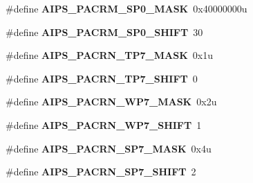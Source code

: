 \begin{DoxyCompactItemize}
\item 
\hypertarget{group___a_i_p_s___register___masks_gaeeebe0a8259e971ab63d9ce8a1576bd2}{}\#define {\bfseries A\+I\+P\+S\+\_\+\+P\+A\+C\+R\+M\+\_\+\+S\+P0\+\_\+\+M\+A\+S\+K}~0x40000000u\label{group___a_i_p_s___register___masks_gaeeebe0a8259e971ab63d9ce8a1576bd2}

\item 
\hypertarget{group___a_i_p_s___register___masks_ga46922ecc0b641603107573cba7a84dc1}{}\#define {\bfseries A\+I\+P\+S\+\_\+\+P\+A\+C\+R\+M\+\_\+\+S\+P0\+\_\+\+S\+H\+I\+F\+T}~30\label{group___a_i_p_s___register___masks_ga46922ecc0b641603107573cba7a84dc1}

\item 
\hypertarget{group___a_i_p_s___register___masks_gaec5f089f628c32d399bbe6ed2e3dfcc9}{}\#define {\bfseries A\+I\+P\+S\+\_\+\+P\+A\+C\+R\+N\+\_\+\+T\+P7\+\_\+\+M\+A\+S\+K}~0x1u\label{group___a_i_p_s___register___masks_gaec5f089f628c32d399bbe6ed2e3dfcc9}

\item 
\hypertarget{group___a_i_p_s___register___masks_ga04cafa9eff42e145fece56b997ae83ee}{}\#define {\bfseries A\+I\+P\+S\+\_\+\+P\+A\+C\+R\+N\+\_\+\+T\+P7\+\_\+\+S\+H\+I\+F\+T}~0\label{group___a_i_p_s___register___masks_ga04cafa9eff42e145fece56b997ae83ee}

\item 
\hypertarget{group___a_i_p_s___register___masks_ga1000a4bd55fe0e5f30e82344f18c24c5}{}\#define {\bfseries A\+I\+P\+S\+\_\+\+P\+A\+C\+R\+N\+\_\+\+W\+P7\+\_\+\+M\+A\+S\+K}~0x2u\label{group___a_i_p_s___register___masks_ga1000a4bd55fe0e5f30e82344f18c24c5}

\item 
\hypertarget{group___a_i_p_s___register___masks_ga862ae8fd2cdce6bb58dbf89582326cbc}{}\#define {\bfseries A\+I\+P\+S\+\_\+\+P\+A\+C\+R\+N\+\_\+\+W\+P7\+\_\+\+S\+H\+I\+F\+T}~1\label{group___a_i_p_s___register___masks_ga862ae8fd2cdce6bb58dbf89582326cbc}

\item 
\hypertarget{group___a_i_p_s___register___masks_ga02b86628ee62e44f1c4bae10dbeeb500}{}\#define {\bfseries A\+I\+P\+S\+\_\+\+P\+A\+C\+R\+N\+\_\+\+S\+P7\+\_\+\+M\+A\+S\+K}~0x4u\label{group___a_i_p_s___register___masks_ga02b86628ee62e44f1c4bae10dbeeb500}

\item 
\hypertarget{group___a_i_p_s___register___masks_ga5f23eed2592489a9bd76ec02a605543c}{}\#define {\bfseries A\+I\+P\+S\+\_\+\+P\+A\+C\+R\+N\+\_\+\+S\+P7\+\_\+\+S\+H\+I\+F\+T}~2\label{group___a_i_p_s___register___masks_ga5f23eed2592489a9bd76ec02a605543c}


\end{DoxyCompactItemize}
